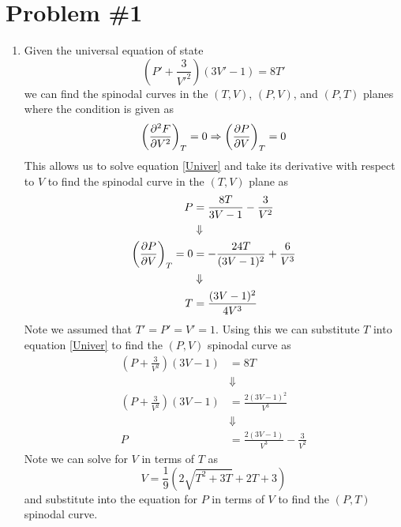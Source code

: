 \documentclass[11pt]{article}
\numberwithin{equation}{section}
\begin{document}


\section{Problem \#1}
\begin{enumerate}[(1)]
\item Given the universal equation of state
\begin{equation}
\left(P'+\frac{3}{V'^{2}}\right)\left(3V'-1\right)=8T'
\label{Univer}
\end{equation}
we can find the spinodal curves in the $(T,V)$, $(P,V)$, and $(P,T)$ planes where the
condition is given as
$$\left(\frac{\partial{^2F}}{\partial{V^2}}\right)_{T} = 0 \Rightarrow \left(\frac{\partial{P}}{\partial{V}}\right)_{T} = 0$$
This allows us to solve equation \ref{Univer} and take its derivative with respect to $V$
to find the spinodal curve in the $(T,V)$ plane as
\begin{align*}
P &= \frac{8T}{3V-1}-\frac{3}{V^2}\\
&\Downarrow\\
\left(\frac{\partial{P}}{\partial{V}}\right)_{T} = 0 &= -\frac{24T}{(3V-1)^2} + \frac{6}{V^3}\\
&\Downarrow\\
T &= \frac{(3V-1)^2}{4V^3}\\
\end{align*}
Note we assumed that $T'=P'=V'=1$. Using this we can substitute $T$ into equation
\ref{Univer} to find the $(P,V)$ spinodal curve as
\begin{align*}
\left(P+\frac{3}{V^{2}}\right)\left(3V-1\right) &= 8T\\
&\Downarrow\\
\left(P+\frac{3}{V^{2}}\right)\left(3V-1\right) &= \frac{2(3V-1)^2}{V^3}\\
&\Downarrow\\
P &= \frac{2(3V-1)}{V^3} - \frac{3}{V^2}
\end{align*}
Note we can solve for $V$ in terms of $T$ as 
$$V = \frac{1}{9}\left(2\sqrt{T^2+3T}+2T+3\right)$$
and substitute into the equation for $P$ in terms of $V$ to find the $(P,T)$ spinodal curve.


\end{enumerate}
\end{document}
